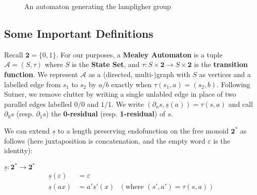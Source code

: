 \documentclass[runningheads]{llncs}
\newcommand{\A}{\mathcal{A}}
\newcommand{\2}{\textbf{2}}
\newcommand{\del}{\partial}
\begin{document}
\begin{figure}

\caption{An automaton generating the lampligher group}
\label{fig:1}
\end{figure}

\subsection{Some Important Definitions}

Recall $\2 = \{0,1\}$. For our purposes, a \textbf{Mealey Automaton} is a 
tuple $\A = (S, \tau)$ where $S$ is the \textbf{State Set}, and 
$\tau : S \times \2 \to S \times \2$ is the \textbf{transition function}. 
We represent $\A$ as a (directed, multi-)graph with $S$ as vertices and a 
labelled edge from $s_1$ to $s_2$ by $a/b$ exactly when $\tau(s_1,a) = (s_2,b)$.
Following Sutner, we remove clutter by writing a single unlabled edge in place
of two parallel edges labelled $0/0$ and $1/1$.
We write $(\del_a s, \underline{s}(a)) = \tau(s,a)$ and call $\del_0 s$ 
(resp. $\del_1 s$) the \textbf{0-residual} (resp. \textbf{1-residual}) of $s$.

We can extend $\underline{s}$ to a length preserving endofunction on the 
free monoid $\2^*$ as follows (here juxtaposition is concatenation, 
and the empty word $\varepsilon$ is the identity):

$\underline{s} : \2^* \to \2^*$
\begin{align*}
  \underline{s}(\varepsilon) &= \varepsilon\\
  \underline{s}(ax)       &= a' \underline{s'}(x) 
  ~~~(\text{where } (s', a') = \tau(s,a))
\end{align*}
\end{document}
